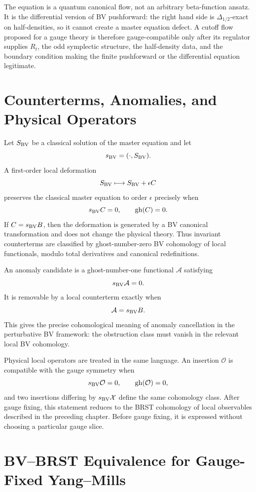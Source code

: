 The equation is a quantum canonical flow, not an arbitrary beta-function
ansatz.  It is the differential version of BV pushforward: the right hand side
is \(\Delta_{1/2}\)-exact on half-densities, so it cannot create a master
equation defect.  A cutoff flow proposed for a gauge theory is therefore
gauge-compatible only after its regulator supplies \(R_t\), the odd symplectic
structure, the half-density data, and the boundary condition making the
finite pushforward or the differential equation legitimate.

\section{Counterterms, Anomalies, and Physical Operators}

Let \(S_{\rm BV}\) be a classical solution of the master equation and let
\[
  s_{\rm BV}=(\cdot,S_{\rm BV}).
\]
A first-order local deformation
\[
  S_{\rm BV}\longmapsto S_{\rm BV}+\epsilon C
\]
preserves the classical master equation to order \(\epsilon\) precisely when
\[
  s_{\rm BV}C=0,
  \qquad
  \operatorname{gh}(C)=0.
\]
If \(C=s_{\rm BV}B\), then the deformation is generated by a BV canonical
transformation and does not change the physical theory.  Thus invariant
counterterms are classified by ghost-number-zero BV cohomology of local
functionals, modulo total derivatives and canonical redefinitions.

An anomaly candidate is a ghost-number-one functional \(\mathcal A\) satisfying
\[
  s_{\rm BV}\mathcal A=0.
\]
It is removable by a local counterterm exactly when
\[
  \mathcal A=s_{\rm BV}B .
\]
This gives the precise cohomological meaning of anomaly cancellation in the
perturbative BV framework: the obstruction class must vanish in the relevant
local BV cohomology.

Physical local operators are treated in the same language.  An insertion
\(\mathcal O\) is compatible with the gauge symmetry when
\[
  s_{\rm BV}\mathcal O=0,
  \qquad
  \operatorname{gh}(\mathcal O)=0,
\]
and two insertions differing by \(s_{\rm BV}\mathcal X\) define the same
cohomology class.  After gauge fixing, this statement reduces to the BRST
cohomology of local observables described in the preceding chapter.  Before
gauge fixing, it is expressed without choosing a particular gauge slice.

\section{BV--BRST Equivalence for Gauge-Fixed Yang--Mills}
\label{sec:bv-brst-equivalence-ym}

